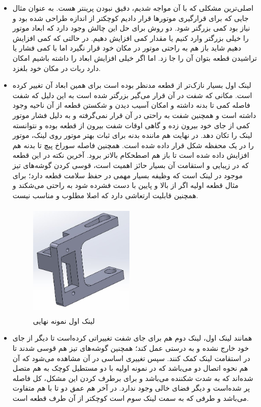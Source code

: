 \begin{itemize}
	\newpage
	\item اصلی‌ترین مشکلی که با آن مواجه شدیم، دقیق نبودن پرینتر هست. به عنوان مثال جایی که برای قرارگیری موتورها قرار دادیم کوچکتر از اندازه طراحی شده بود و نیاز بود کمی بزرگتر شود. دو روش برای حل این چالش وجود دارد که ابعاد موتور را خیلی بزرگتر وارد کنیم یا مقدار کمی افزایش دهیم. در حالتی که کمی افزایش دهیم شاید باز هم به راحتی موتور در مکان خود قرار نگیرد اما با کمی فشار یا تراشیدن قطعه بتوان آن را جا زد. اما اگر خیلی افزایش ابعاد را داشته باشیم امکان دارد ربات در مکان خود بلغزد.
	\item لینک اول بسیار نازک‌‌تر از قطعه مدنظر بوده است برای همین ابعاد آن تغییر کرده است. مکانی که شفت در آن قرار می‌گیر بزرگتر شده است به این دلیل که شفت فاصله کمی تا بدنه داشته و امکان آسیب دیدن و شکستن قطعه از آن ناحیه وجود داشته است و همچنین شفت به راحتی در آن قرار نمی‌گرفته و به دلیل فشار موتور کمی از جای خود بیرون زده و گاهی اوقات شفت بیرون از قطعه بوده و نتوانسته لینک را تکان دهد. در نهایت هم ماننده بدنه برای ثبات بهتر موتور روی لینک، موتور را در یک محفظه  شکل قرار داده شده است. همچنین فاصله سوراخ پیچ تا بدنه هم افزایش داده شده است تا باز هم اصطحکام بالاتر برود. آخرین نکته در این قطعه که در زیبایی و استقامت آن بسیار حائز اهمیت است، قوسی کردن گوشه‌های تیز موجود در لینک است که وظیفه بسیار مهمی در حفظ سلامت قطعه دارد؛ برای مثال قطعه اولیه اگر از بالا و پایین با دست فشرده شود به راحتی می‌شکند و همچنین قابلیت ارتعاشی دارد که اصلا مطلوب و مناسب نیست.
	
	\begin{figure}[!h]	
	\vspace{0.2cm}
	\centering
	\includegraphics[height=5.5cm,width=5cm]{./Images/CH2/Link1_Final.JPG}
	\caption{لینک اول نمونه نهایی}
	\label{لینک اول نمونه نهایی}
	\end{figure}
	
	\newpage
	\item همانند لینک اول، لینک دوم هم برای جای شفت تغییراتی کرده‌است تا دیگر از جای خود خارج نشده و به درستی عمل کند؛ همچنین گوشه‌های تیز هم قوسی شدند تا در استقامت لینک کمک کنند. سپس تغییری اساسی در آن مشاهده می‌شود که آن هم نحوه اتصال دو  می‌باشد که در نمونه اولیه با دو مستطیل کوچک به هم متصل شده‌اند که به شدت شکننده می‌باشد و برای برطرف کردن این مشکل، کل فاصله پر شده‌است و دیگر فضای خالی وجود ندارد. در آخر هم عمق دو تا  با هم متفاوت می‌باشد و طرفی که به سمت لینک سوم است کوچکتر از آن طرف قطعه است.
	

\end{itemize}
